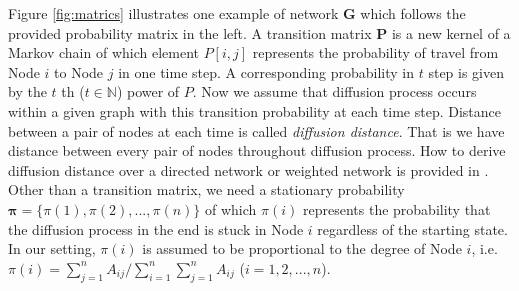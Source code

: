 \documentclass[12pt]{article}
\theoremstyle{definition}
\begin{document}
Figure \ref{fig:matrics} illustrates one example of network $\mathbf{G}$ which follows the provided probability matrix in the left. A transition matrix $\mathbf{P}$ is a new kernel of a Markov chain of which element $P[i,j]$ represents the probability of travel from Node $i$ to Node $j$ in one time step. A corresponding probability in $t$ step is given by the $t$ th ($t \in \mathbb{N}$) power of $P$. Now we assume that diffusion process occurs within a given graph with this transition probability at each time step. Distance between a pair of nodes at each time is called \textit{diffusion distance}. That is we have distance between every pair of nodes throughout diffusion process. How to derive diffusion distance over a directed network or weighted network is provided in \cite{tang2010graph}. Other than a transition matrix, we need a stationary probability $\boldsymbol{\pi} = \{\pi(1), \pi(2), ... , \pi(n) \}$ of which $\pi(i)$ represents the probability that the diffusion process in the end is stuck in Node $i$ regardless of the starting state. In our setting, $\pi(i)$ is assumed to be proportional to the degree of Node $i$, i.e. $\pi(i) = \sum\limits_{j=1}^{n} A_{ij} \big/ \sum\limits_{i=1}^{n}\sum\limits_{j=1}^{n} A_{ij}$ ($i=1,2,..., n$).   
\end{document}
